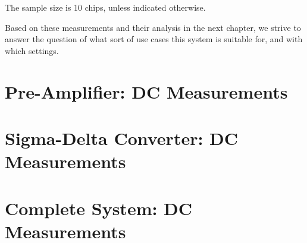 The sample size is 10 chips, unless indicated otherwise.

Based on these  measurements and their analysis in the next chapter, we strive
to answer the question of what sort of use cases this system  is suitable for,
and with which settings.



\section{Pre-Amplifier: DC Measurements}
\label{sec:preAmpDC}



\section{Sigma-Delta Converter: DC Measurements}
\label{sec:sigdelDC}

\section{Complete System: DC Measurements}
\label{sec:systemDC}

